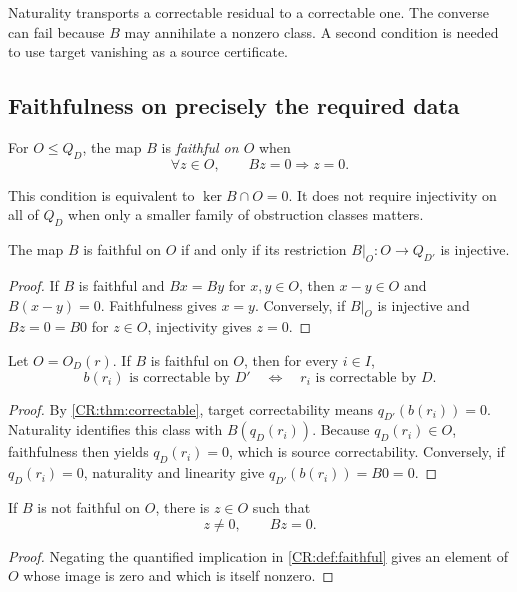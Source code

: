 Naturality transports a correctable residual to a correctable one. The converse can fail because $B$ may annihilate a nonzero class. A second condition is needed to use target vanishing as a source certificate.

\subsection{Faithfulness on precisely the required data}
\begin{CRdefinition}\label{CR:def:faithful}
For $O\leq Q_D$, the map $B$ is \emph{faithful on $O$} when
\[
\forall z\in O,\qquad Bz=0\Longrightarrow z=0.
\]
\end{CRdefinition}

This condition is equivalent to $\ker B\cap O=0$. It does not require injectivity on all of $Q_D$ when only a smaller family of obstruction classes matters.

\begin{CRproposition}\label{CR:prop:faithful-inj}
The map $B$ is faithful on $O$ if and only if its restriction $B\vert_O:O\to Q_{D'}$ is injective.
\end{CRproposition}
\begin{proof}
If $B$ is faithful and $Bx=By$ for $x,y\in O$, then $x-y\in O$ and $B(x-y)=0$. Faithfulness gives $x=y$. Conversely, if $B\vert_O$ is injective and $Bz=0=B0$ for $z\in O$, injectivity gives $z=0$.
\end{proof}

\begin{CRtheorem}\label{CR:thm:faithful}
Let $O=O_D(r)$. If $B$ is faithful on $O$, then for every $i\in I$,
\[
b(r_i)\text{ is correctable by }D'
\quad\Longleftrightarrow\quad
r_i\text{ is correctable by }D.
\]
\end{CRtheorem}
\begin{proof}
By \cref{CR:thm:correctable}, target correctability means $q_{D'}(b(r_i))=0$. Naturality identifies this class with $B(q_D(r_i))$. Because $q_D(r_i)\in O$, faithfulness then yields $q_D(r_i)=0$, which is source correctability. Conversely, if $q_D(r_i)=0$, naturality and linearity give $q_{D'}(b(r_i))=B0=0$.
\end{proof}

\begin{CRproposition}\label{CR:prop:loss-witness}
If $B$ is not faithful on $O$, there is $z\in O$ such that
\[
z\ne0,\qquad Bz=0.
\]
\end{CRproposition}
\begin{proof}
Negating the quantified implication in \cref{CR:def:faithful} gives an element of $O$ whose image is zero and which is itself nonzero.
\end{proof}

